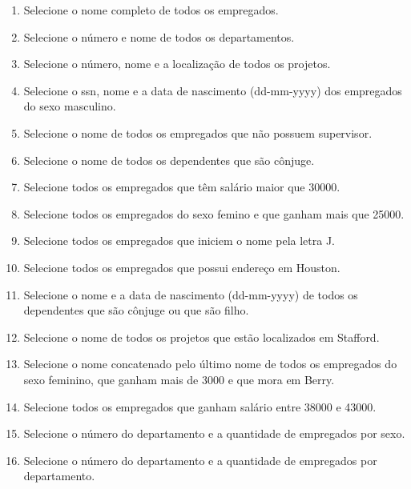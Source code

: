 \documentclass[11pt]{article}
\begin{document}
	\begin{enumerate}
		\item Selecione o nome completo de todos os empregados.
		
		\item Selecione o número e nome de todos os departamentos.
		
		\item Selecione o número, nome e a localização de todos os projetos.
				
		\item Selecione o ssn, nome e a data de nascimento (dd-mm-yyyy) dos empregados do sexo masculino.
		
		\item Selecione o nome de todos os empregados que não possuem supervisor.
		
		\item Selecione o nome de todos os dependentes que são cônjuge.
		
		\item Selecione todos os empregados que têm salário maior que 30000.
		
		\item Selecione todos os empregados do sexo femino e que ganham mais que 25000.
		
		\item Selecione todos os empregados que iniciem o nome pela letra J.

		\item Selecione todos os empregados que possui endereço em Houston.
				
		\item Selecione o nome e a data de nascimento (dd-mm-yyyy) de todos os dependentes que são cônjuge ou que são filho.
		
		\item Selecione o nome de todos os projetos que estão localizados em Stafford.
		
		\item Selecione o nome concatenado pelo último nome de todos os empregados do sexo feminino, que ganham mais de 3000 e que mora em Berry.
		
		\item Selecione todos os empregados que ganham salário entre 38000 e 43000.
		
		\item Selecione o número do departamento e a quantidade de empregados por sexo.
		
		\item Selecione o número do departamento e a quantidade de empregados por departamento.
		

\end{enumerate}
\end{document}
